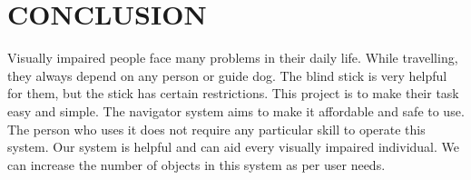 \documentclass[conference]{IEEEtran}
\begin{document}
\section{CONCLUSION}

Visually impaired people face many problems in their daily life. While travelling, they always depend on any person or guide dog. The blind stick is very helpful for them, but the stick has certain restrictions. This project is to make their task easy and simple. The navigator system aims to make it affordable and safe to use. The person who uses it does not require any particular skill to operate this system. Our system is helpful and can aid every visually impaired individual. We can increase the number of objects in this system as per user needs.

\end{document}
